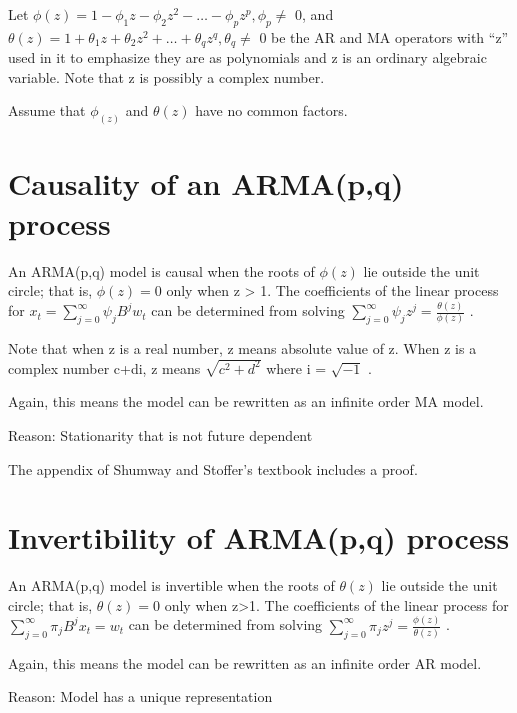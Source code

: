 \documentclass[
]{book}
\theoremstyle{definition}
\theoremstyle{definition}
\theoremstyle{definition}
\theoremstyle{definition}
\theoremstyle{remark}
\begin{document}
Let \(\phi(z) = 1-\phi_1z-\phi_2z^2-…-\phi_pz^p, \phi_p\ne\) 0, and \(\theta(z) = 1+\theta_1z+\theta_2z^2+…+\theta_qz^q, \theta_q\ne\) 0
be the AR and MA operators with ``z'' used in it to emphasize they are as polynomials and z is an ordinary algebraic variable. Note that z is possibly a complex number.

Assume that \(\phi_(z)\) and \(\theta(z)\) have no common factors.

\hypertarget{causality-of-an-armapq-process}{%
\section{Causality of an ARMA(p,q) process}\label{causality-of-an-armapq-process}}

An ARMA(p,q) model is causal when the roots of \(\phi(z)\) lie outside the unit circle; that is, \(\phi(z) = 0\) only when \textbar z\textbar{} \textgreater{} 1. The coefficients of the linear process for \(x_t=\sum_{j=0}^{\infty}\psi_jB^jw_t\) can be determined from solving \(\sum_{j=0}^{\infty}\psi_jz^j=\frac{\theta(z)}{\phi(z)}\) .

Note that when z is a real number, \textbar z\textbar{} means absolute value of z. When z is a complex number c+di, \textbar z\textbar{} means \(\sqrt{c^2+d^2}\) where i = \(\sqrt{-1}\) .

Again, this means the model can be rewritten as an infinite order MA model.

Reason: Stationarity that is not future dependent

The appendix of Shumway and Stoffer's textbook includes a proof.

\hypertarget{invertibility-of-armapq-process}{%
\section{Invertibility of ARMA(p,q) process}\label{invertibility-of-armapq-process}}

An ARMA(p,q) model is invertible when the roots of \(\theta(z)\) lie outside the unit circle; that is, \(\theta(z) = 0\) only when \textbar z\textbar\textgreater1. The coefficients of the linear process for \(\sum_{j=0}^{\infty}\pi_jB^jx_t=w_t\) can be determined from solving \(\sum_{j=0}^{\infty}\pi_jz^j=\frac{\phi(z)}{\theta(z)}\) .

Again, this means the model can be rewritten as an infinite order AR model.

Reason: Model has a unique representation
\end{document}
